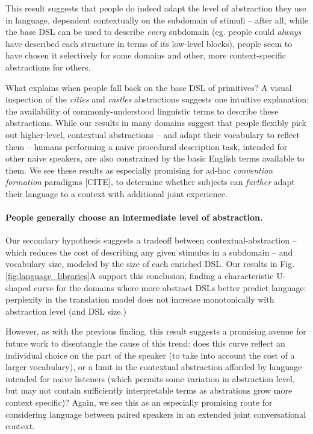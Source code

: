 \documentclass[10pt,letterpaper]{article}
\begin{document}
This result suggests that people do indeed adapt the level of abstraction they use in language, dependent contextually on the subdomain of stimuli -- after all, while the base DSL can be used to describe \textit{every} subdomain (eg. people could \textit{always} have described each structure in terms of its low-level blocks), people seem to have chosen it selectively for some domains and other, more context-specific abstractions for others.

What explains when people fall back on the base DSL of primitives? A visual inspection of the \textit{cities} and \textit{castles} abstractions suggests one intuitive explanation: the availability of commonly-understood linguistic terms to describe these abstractions. While our results in many domains suggest that people flexibly pick out higher-level, contextual abstractions -- and adapt their vocabulary to reflect them -- humans performing a naive procedural description task, intended for other naive speakers, are also constrained by the basic English terms available to them. We see these results as especially promising for ad-hoc \textit{convention formation} paradigms [CITE], to determine whether subjects can \textit{further} adapt their language to a context with additional joint experience.

\paragraph{People generally choose an intermediate level of abstraction.} Our secondary hypothesis suggests a tradeoff between contextual-abstraction -- which reduces the cost of describing any given stimulus in a subdomain -- and vocabulary size, modeled by the size of each enriched DSL. Our results in Fig.  \ref{fig:language_libraries}A support this conclusion, finding a characteristic U-shaped curve for the domains where more abstract DSLs better predict language: perplexity in the translation model does not increase monotonically with abstraction level (and DSL size.)

However, as with the previous finding, this result suggests a promising avenue for future work to disentangle the cause of this trend: does this curve reflect an individual choice on the part of the speaker (to take into account the cost of a larger vocabulary), or a limit in the contextual abstraction afforded by language intended for naive listeners (which permits some variation in abstraction level, but may not contain sufficiently interpretable terms as abstrations grow more context specific)? Again, we see this as an especially promising route for considering language between paired speakers in an extended joint conversational context.
\end{document}
